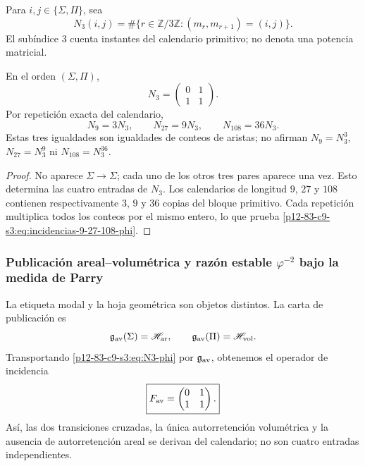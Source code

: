 \begin{definition}
Para \(i,j\in\{\Sigma,\Pi\}\), sea
\[
 N_3(i,j)=
 \#\{r\in\mathbb Z/3\mathbb Z:(m_r,m_{r+1})=(i,j)\}.
\]
El subíndice \(3\) cuenta instantes del calendario primitivo; no denota una
potencia matricial.
\end{definition}

\begin{theorem}
\label{p12-83-c9-s3:thm:descenso-incidencia-modal-phi}
En el orden \((\Sigma,\Pi)\),
\begin{equation}
 \boxed{
 N_3=
 \begin{pmatrix}
 0&1\\
 1&1
 \end{pmatrix}.}
 \label{p12-83-c9-s3:eq:N3-phi}
\end{equation}
Por repetición exacta del calendario,
\begin{equation}
 \boxed{
 N_9=3N_3,
 \qquad
 N_{27}=9N_3,
 \qquad
 N_{108}=36N_3.}
 \label{p12-83-c9-s3:eq:incidencias-9-27-108-phi}
\end{equation}
Estas tres igualdades son igualdades de conteos de aristas; no afirman
\(N_9=N_3^3\), \(N_{27}=N_3^9\) ni \(N_{108}=N_3^{36}\).
\end{theorem}

\begin{proof}
No aparece \(\Sigma\to\Sigma\); cada uno de los otros tres pares aparece
una vez. Esto determina las cuatro entradas de \(N_3\). Los calendarios de
longitud \(9\), \(27\) y \(108\) contienen respectivamente \(3\), \(9\)
y \(36\) copias del bloque primitivo. Cada repetición multiplica todos los
conteos por el mismo entero, lo que prueba
\eqref{p12-83-c9-s3:eq:incidencias-9-27-108-phi}.
\end{proof}

\subsubsection{Publicación areal–volumétrica y razón estable \(\varphi^{-2}\) bajo la medida de Parry}

La etiqueta modal y la hoja geométrica son objetos distintos. La carta
de publicación es
\[
 \mathfrak g_{\rm av}(\Sigma)=\mathscr H_{\rm ar},
 \qquad
 \mathfrak g_{\rm av}(\Pi)=\mathscr H_{\rm vol}.
\]
Transportando \eqref{p12-83-c9-s3:eq:N3-phi} por \(\mathfrak g_{\rm av}\), obtenemos
el operador de incidencia
\begin{equation}
 \boxed{
 F_{\rm av}=
 \begin{pmatrix}
 0&1\\
 1&1
 \end{pmatrix}.}
 \label{p12-83-c9-s3:eq:Fav-derivada-phi}
\end{equation}
Así, las dos transiciones cruzadas, la única autorretención volumétrica y la
ausencia de autorretención areal se derivan del calendario; no son cuatro
entradas independientes.

